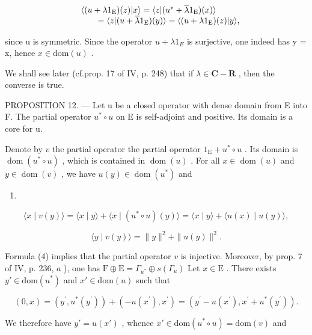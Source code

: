 \[
\begin{array}{r l} & {\langle (u + \lambda 1 _ {\mathrm{E}}) (z) | x \rangle = \langle z | (u ^ {*} + \overline {{\lambda}} 1 _ {\mathrm{E}}) (x) \rangle} \\ & {\qquad = \langle z | (u + \overline {{\lambda}} 1 _ {\mathrm{E}}) (y) \rangle = \langle (u + \lambda 1 _ {\mathrm{E}}) (z) | y \rangle ,} \end{array}
\]

since u is symmetric. Since the operator \(u + \lambda1_{E}\) is surjective, one indeed has y = x, hence \(x \in \text{dom}(u)\) .

We shall see later (cf.prop. 17 of IV, p. 248) that if \(\lambda \in \mathbf{C} - \mathbf{R}\) , then the converse is true.

PROPOSITION 12. --- Let u be a closed operator with dense domain from E into F. The partial operator \(u^{*}\circ u\) on E is self-adjoint and positive. Its domain is a core for u.

Denote by \(v\) the partial operator the partial operator \(1_{\mathrm{E}} + u^{*} \circ u\) . Its domain is \(\operatorname{dom}(u^{*} \circ u)\) , which is contained in \(\operatorname{dom}(u)\) . For all \(x \in \operatorname{dom}(u)\) and \(y \in \operatorname{dom}(v)\) , we have \(u(y) \in \operatorname{dom}(u^{*})\) and

\begin{enumerate}
\def\labelenumi{(\arabic{enumi})}
\setcounter{enumi}{2}
\tightlist
\item
\end{enumerate}

\[
\langle x \mid v (y) \rangle = \langle x \mid y \rangle + \langle x \mid (u ^ {*} \circ u) (y) \rangle = \langle x \mid y \rangle + \langle u (x) \mid u (y) \rangle ,\tag{4}
\]

\[
\langle y \mid v (y) \rangle = \| y \| ^ {2} + \| u (y) \| ^ {2}.
\]

Formula (4) implies that the partial operator \(v\) is injective. Moreover, by prop. 7 of IV, p. 236, \(a\) ), one has \(\mathrm{F} \oplus \mathrm{E} = \Gamma_{u^*} \oplus s(\Gamma_u)\) Let \(x \in \mathrm{E}\) . There exists \(y' \in \mathrm{dom}(u^*)\) and \(x' \in \mathrm{dom}(u)\) such that

\[
(0, x) = (y ^ {\prime}, u ^ {*} (y ^ {\prime})) + (- u (x ^ {\prime}), x ^ {\prime}) = (y ^ {\prime} - u (x ^ {\prime}), x ^ {\prime} + u ^ {*} (y ^ {\prime})).
\]

We therefore have \(y' = u(x')\) , whence \(x' \in \text{dom}(u^* \circ u) = \text{dom}(v)\) and

